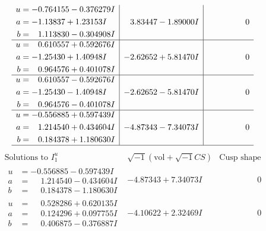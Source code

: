 \documentclass[1p]{elsarticle_modified}
\theoremstyle{definition}
\newcommand{\I}{\sqrt{-1}}
\begin{document}
$$\begin{array}{c|c|c}
\begin{aligned}
u &= -0.764155 - 0.376279 I \\
a &= -1.13837 + 1.23153 I \\
b &= \phantom{-}1.113830 - 0.304908 I\end{aligned}
 & \phantom{-}3.83447 - 1.89000 I & \phantom{-0.000000 } 0 \\ \hline\begin{aligned}
u &= \phantom{-}0.610557 + 0.592676 I \\
a &= -1.25430 + 1.40948 I \\
b &= \phantom{-}0.964576 + 0.401078 I\end{aligned}
 & -2.62652 + 5.81470 I & \phantom{-0.000000 } 0 \\ \hline\begin{aligned}
u &= \phantom{-}0.610557 - 0.592676 I \\
a &= -1.25430 - 1.40948 I \\
b &= \phantom{-}0.964576 - 0.401078 I\end{aligned}
 & -2.62652 - 5.81470 I & \phantom{-0.000000 } 0 \\ \hline\begin{aligned}
u &= -0.556885 + 0.597439 I \\
a &= \phantom{-}1.214540 + 0.434604 I \\
b &= \phantom{-}0.184378 + 1.180630 I\end{aligned}
 & -4.87343 - 7.34073 I & \phantom{-0.000000 } 0\\
 \hline 
 \end{array}$$\newpage$$\begin{array}{c|c|c}  
\text{Solutions to }I^u_{1}& \I (\text{vol} + \sqrt{-1}CS) & \text{Cusp shape}\\
 \hline 
\begin{aligned}
u &= -0.556885 - 0.597439 I \\
a &= \phantom{-}1.214540 - 0.434604 I \\
b &= \phantom{-}0.184378 - 1.180630 I\end{aligned}
 & -4.87343 + 7.34073 I & \phantom{-0.000000 } 0 \\ \hline\begin{aligned}
u &= \phantom{-}0.528286 + 0.620135 I \\
a &= \phantom{-}0.124296 + 0.097755 I \\
b &= \phantom{-}0.406875 - 0.376887 I\end{aligned}
 & -4.10622 + 2.32469 I & \phantom{-0.000000 } 0 \\ \hline\begin{aligned}

\end{aligned}
\end{array}$$
\end{document}
